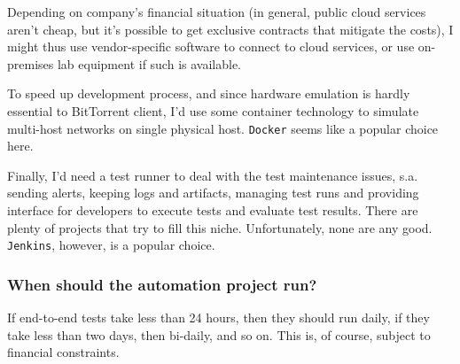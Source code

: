 \documentclass[11pt]{article}
\begin{document}
Depending on company's financial situation (in general, public
cloud services aren't cheap, but it's possible to get exclusive
contracts that mitigate the costs), I might thus use
vendor-specific software to connect to cloud services, or use
on-premises lab equipment if such is available.

To speed up development process, and since hardware emulation is
hardly essential to BitTorrent client, I'd use some container
technology to simulate multi-host networks on single physical
host.  \texttt{Docker} seems like a popular choice here.

Finally, I'd need a test runner to deal with the test maintenance
issues, s.a. sending alerts, keeping logs and artifacts, managing
test runs and providing interface for developers to execute tests
and evaluate test results.  There are plenty of projects that try
to fill this niche.  Unfortunately, none are any good.  \texttt{Jenkins},
however, is a popular choice.

\subsubsection{When should the automation project run?}
\label{sec:orge24e6dc}
If end-to-end tests take less than 24 hours, then they should run
daily, if they take less than two days, then bi-daily, and so on.
This is, of course, subject to financial constraints.
\end{document}
